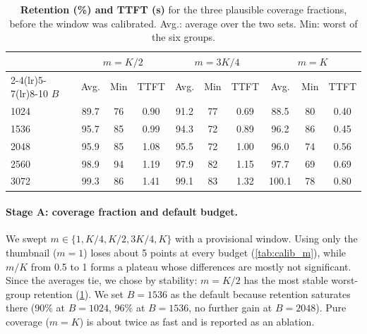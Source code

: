 \begin{table}[t]
  \centering
  \footnotesize
  \setlength{\tabcolsep}{2pt}
  \begin{tabular}{l ccc ccc ccc}
    \toprule
    & \multicolumn{3}{c}{$m=K/2$} & \multicolumn{3}{c}{$m=3K/4$} & \multicolumn{3}{c}{$m=K$} \\
    \cmidrule(lr){2-4}\cmidrule(lr){5-7}\cmidrule(lr){8-10}
    $B$ & Avg. & Min & TTFT & Avg. & Min & TTFT & Avg. & Min & TTFT \\
    \midrule
    1024 & 89.7 & 76 & 0.90 & 91.2 & 77 & 0.69 & 88.5 & 80 & 0.40 \\
    1536 & 95.7 & 85 & 0.99 & 94.3 & 72 & 0.89 & 96.2 & 86 & 0.45 \\
    2048 & 95.9 & 85 & 1.08 & 95.5 & 72 & 1.00 & 96.0 & 74 & 0.56 \\
    2560 & 98.9 & 94 & 1.19 & 97.9 & 82 & 1.15 & 97.7 & 69 & 0.69 \\
    3072 & 99.3 & 86 & 1.41 & 99.1 & 83 & 1.32 & 100.1 & 78 & 0.80 \\
    \bottomrule
  \end{tabular}
  \caption{\textbf{Retention (\%) and TTFT (s)} for the three plausible coverage fractions, before the window was calibrated. Avg.: average over the two sets. Min: worst of the six groups.}
  \label{tab:calib_ret}
\end{table}

\paragraph{Stage A: coverage fraction and default budget.}
We swept $m\in\{1,K/4,K/2,3K/4,K\}$ with a provisional window. Using only the thumbnail ($m=1$) loses about 5
points at every budget (\cref{tab:calib_m}), while $m/K$ from 0.5 to 1 forms a plateau whose differences are mostly not significant.
Since the averages tie, we chose by stability: $m=K/2$ has the most stable worst-group retention (\cref{tab:calib_ret}). We set
$B=1536$ as the default because retention saturates there (90\% at $B=1024$, 96\% at $B=1536$, no further gain at $B=2048$).
Pure coverage ($m=K$) is about twice as fast and is reported as an ablation.


